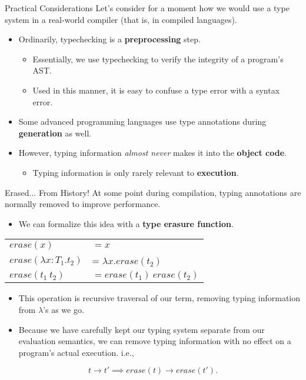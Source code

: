 \documentclass[11pt]{beamer}
\begin{document}
\begin{frame}[fragile=singleslide]{Practical Considerations}
Let's consider for a moment how we would use a type system in a real-world compiler (that is, in compiled languages).
\begin{itemize}
\item Ordinarily, typechecking is a \textbf{preprocessing} step.
\begin{itemize}
\item Essentially, we use typechecking to verify the integrity of a program's AST.  
\item Used in this manner, it is easy to confuse a type error with a syntax error. 
\end{itemize}
\item Some advanced programming languages use type annotations during \textbf{generation} as well.
\item However, typing information \emph{almost never} makes it into the \textbf{object code}.  
\begin{itemize}
\item Typing information is only rarely relevant to \textbf{execution}.  
\end{itemize}
\end{itemize}
\end{frame}


\begin{frame}[fragile=singleslide]{Erased... From History!}
At some point during compilation, typing annotations are normally removed to improve performance.  
\begin{itemize}
\item We can formalize this idea with a \textbf{type erasure function}.
\end{itemize}
\begin{tabular}{ l l }
$erase(x)$ & $= x$ \\
$erase(\lambda x : T_1.t_2)$ & = $\lambda x. erase(t_2)$ \\
$erase(t_1\:t_2)$ & $= erase(t_1)\:erase(t_2)$
\end{tabular}
\begin{itemize}
\item This operation is recursive traversal of our term, removing typing information from $\lambda$'s as we go.  
\item Because we have carefully kept our typing system separate from our evaluation semantics, we can remove typing information with no effect on a program's actual execution.  i.e.,
\end{itemize}
\begin{equation}
t \rightarrow t' \implies erase(t) \rightarrow erase(t'). 
\end{equation}
\end{frame}
\end{document}
